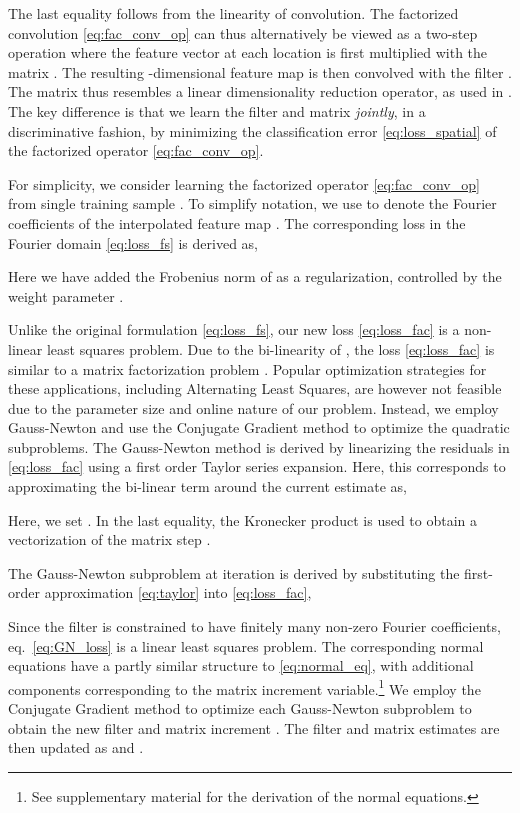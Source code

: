 \documentclass[10pt,twocolumn,letterpaper]{article}
\begin{document}
The last equality follows from the linearity of convolution. The factorized convolution \eqref{eq:fac_conv_op} can thus alternatively be viewed as a two-step operation where the feature vector  at each location  is first multiplied with the matrix . The resulting -dimensional feature map is then convolved with the filter . The matrix  thus resembles a linear dimensionality reduction operator, as used in \eg \cite{DanelljanCVPR14}. The key difference is that we learn the filter  and matrix  \emph{jointly}, in a discriminative fashion, by minimizing the classification error \eqref{eq:loss_spatial} of the factorized operator \eqref{eq:fac_conv_op}. 

For simplicity, we consider learning the factorized operator \eqref{eq:fac_conv_op} from single training sample . To simplify notation, we use  to denote the Fourier coefficients of the interpolated feature map . The corresponding loss in the Fourier domain \eqref{eq:loss_fs} is derived as,

Here we have added the Frobenius norm of  as a regularization, controlled by the weight parameter .

Unlike the original formulation \eqref{eq:loss_fs}, our new loss \eqref{eq:loss_fac} is a non-linear least squares problem. Due to the bi-linearity of , the loss \eqref{eq:loss_fac} is similar to a matrix factorization problem \cite{Hong_2015_ICCV}. Popular optimization strategies for these applications, including Alternating Least Squares, are however not feasible due to the parameter size and online nature of our problem. Instead, we employ Gauss-Newton \cite{NumericalOptimization} and use the Conjugate Gradient method to optimize the quadratic subproblems. The Gauss-Newton method is derived by linearizing the residuals in \eqref{eq:loss_fac} using a first order Taylor series expansion. Here, this corresponds to approximating the bi-linear term  around the current estimate  as,

Here, we set . In the last equality, the Kronecker product  is used to obtain a vectorization of the matrix step .

The Gauss-Newton subproblem at iteration  is derived by substituting the first-order approximation \eqref{eq:taylor} into \eqref{eq:loss_fac},

Since the filter  is constrained to have finitely many non-zero Fourier coefficients, eq.\ \eqref{eq:GN_loss} is a linear least squares problem. The corresponding normal equations have a partly similar structure to \eqref{eq:normal_eq}, with additional components corresponding to the matrix increment  variable.\footnote{See supplementary material for the derivation of the normal equations.} We employ the Conjugate Gradient method to optimize each Gauss-Newton subproblem to obtain the new filter  and matrix increment . The filter and matrix estimates are then updated as  and .
\end{document}
